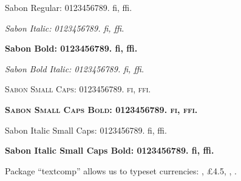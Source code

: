 \documentclass{article}
\begin{document}
\sabonfamily

Sabon Regular: 0123456789. fi, ffi. \kant[1]

{\itshape Sabon Italic: 0123456789. fi, ffi. \kant[2]}



{\bfseries
Sabon Bold: 0123456789. fi, ffi. \kant[5]

\itshape Sabon Bold Italic: 0123456789. fi, ffi. \kant[6]}

{\scshape
Sabon Small Caps: 0123456789. fi, ffi. \kant[57]}

{\scshape\bfseries
Sabon Small Caps Bold: 0123456789. fi, ffi. \kant[58]}

{\itscshape
Sabon Italic Small Caps: 0123456789. fi, ffi. \kant[59]}

{\itscshape\bfseries
Sabon Italic Small Caps Bold: 0123456789. fi, ffi. \kant[60]}


Package ``textcomp'' allows us to typeset currencies: ,
\pounds4.5, , .
\end{document}
